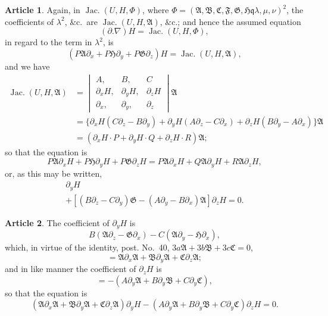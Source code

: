 \documentclass[11pt,a4paper]{article}
\theoremstyle{definition}
\newtheorem{art}{Article}[section]
\DeclareMathOperator{\Jac}{Jac.}
\newcommand{\fA}{\mathfrak{A}}
\newcommand{\fB}{\mathfrak{B}}
\newcommand{\fC}{\mathfrak{C}}
\newcommand{\fF}{\mathfrak{F}}
\newcommand{\fG}{\mathfrak{G}}
\newcommand{\fH}{\mathfrak{H}}
\begin{document}
\setcounter{art}{36}
\begin{art}
Again, in $\Jac(U, H, \Phi)$, where $\Phi = (\fA, \fB, \fC, \fF, \fG, \fH \mathbin{\mathfrak{q}} \lambda, \mu, \nu)^2$,
the coefficients of $\lambda^2$, \&c.\ are $\Jac(U, H, \fA)$, \&c.; and hence the assumed equation
\[
(\partial . \nabla)H = \Jac(U, H, \Phi),
\]
in regard to the term in $\lambda^2$, is
\[
(P\fA\partial_x + P\fH\partial_y + P\fG\partial_z)H = \Jac(U, H, \fA),
\]
and we have
\begin{align*}
\Jac(U, H, \fA) &=
\begin{vmatrix}
A, & B, & C \\
\partial_x H, & \partial_y H, & \partial_z H \\
\partial_x, & \partial_y, & \partial_z
\end{vmatrix}
\fA \\
&= \{\partial_x H(C\partial_z - B\partial_y) + \partial_y H(A\partial_z - C\partial_x)
+ \partial_z H(B\partial_y - A\partial_x)\}\fA \\
&= (\partial_x H \cdot P + \partial_y H \cdot Q + \partial_z H \cdot R)\fA;
\end{align*}
so that the equation is
\[
P\fA\partial_x H + P\fH\partial_y H + P\fG\partial_z H
= P\fA\partial_x H + Q\fA\partial_y H + R\fA\partial_z H,
\]
or, as this may be written,
\begin{multline*}
[(B\partial_z - C\partial_y)\fA - (C\partial_z - A\partial_x)\fA]\partial_y H \\
+ [(B\partial_z - C\partial_y)\fG - (A\partial_y - B\partial_x)\fA]\partial_z H = 0.
\end{multline*}
\end{art}

\setcounter{art}{37}
\begin{art}
The coefficient of $\partial_y H$ is
\[
B(\fA\partial_z - \fG\partial_x) - C(\fA\partial_y - \fH\partial_x),
\]
which, in virtue of the identity, post. No.\ 40,
$3a\fA + 3b\fB + 3c\fC = 0$,
\[
= \fA\partial_x \fA + \fB\partial_y \fA + \fC\partial_z \fA;
\]
and in like manner the coefficient of $\partial_z H$ is
\[
= -(A\partial_y \fA + B\partial_y \fB + C\partial_y \fC),
\]
so that the equation is
\[
(\fA\partial_x \fA + \fB\partial_y \fA + \fC\partial_z \fA)\partial_y H
- (A\partial_y \fA + B\partial_y \fB + C\partial_y \fC)\partial_z H = 0.
\]
\end{art}
\end{document}
